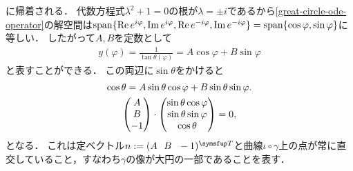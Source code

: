 \documentclass{ltjsarticle}
\begin{document}
に帰着される．
代数方程式\(\lambda^2 + 1 = 0\)の根が\(\lambda = \pm i\)であるから\ref{great-circle-ode-operator}の解空間は\(\operatorname{span} \{\operatorname{Re} e^{i\varphi}, \operatorname{Im} e^{i\varphi}, \operatorname{Re} e^{-i\varphi}, \operatorname{Im} e^{-i\varphi}\} = \operatorname{span} \{\cos \varphi, \sin \varphi\}\)に等しい．
したがって\(A, B\)を定数として
\begin{align*}
    y(\varphi) = \frac{1}{\tan \theta(\varphi)} = A \cos \varphi + B \sin \varphi
\end{align*}
と表すことができる．
この両辺に\(\sin \theta\)をかけると
\begin{gather}
    \cos \theta  = A \sin \theta \cos \varphi + B \sin \theta \sin \varphi. \notag \\
    \begin{pmatrix}
        A \\
        B \\
        - 1 \\
    \end{pmatrix}
    \cdot
    \begin{pmatrix}
        \sin \theta \cos \varphi \\
        \sin \theta \sin \varphi  \\
        \cos \theta
    \end{pmatrix}
    = 0,
\end{gather}
となる．
これは定ベクトル\(n := (A\ \ B\ \ -1)^{\transpose}\)と曲線\(\iota \circ \gamma\)上の点が常に直交していること，すなわち\(\gamma\)の像が大円の一部であることを表す．
\end{document}
